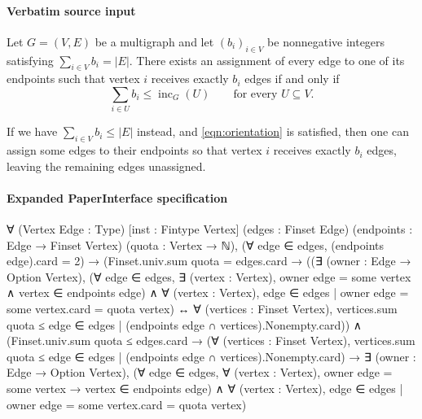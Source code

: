 \documentclass[10pt]{article}
\begin{document}
\paragraph{Verbatim source input}
\begin{ReviewVerbatim}
\begin{lemma}\label{lem:balancedorientation}
Let $G=(V,E)$ be a multigraph and let $(b_i)_{i\in V}$ be nonnegative
integers satisfying $\sum_{i\in V}b_i=|E|$.  There exists an assignment of
every edge to one of its endpoints such that vertex $i$ receives exactly
$b_i$ edges if and only if
\begin{equation}\label{eqn:orientation}
    \sum_{i\in U}b_i\le \operatorname{inc}_G(U)
 \qquad\text{for every }U\subseteq V.
\end{equation}

If we have \(\sum_{i\in V}b_i\le |E|\) instead, and \eqref{eqn:orientation} is satisfied, then one can assign some edges to their endpoints so that vertex \(i\)
receives exactly \(b_i\) edges, leaving the remaining edges unassigned.
\end{lemma}
\end{ReviewVerbatim}



\paragraph{Expanded PaperInterface specification}
\begin{ReviewVerbatim}
∀ (Vertex Edge : Type) [inst : Fintype Vertex] (edges : Finset Edge) (endpoints : Edge → Finset Vertex)
  (quota : Vertex → ℕ),
  (∀ edge ∈ edges, (endpoints edge).card = 2) →
    (Finset.univ.sum quota = edges.card →
        ((∃ (owner : Edge → Option Vertex),
            (∀ edge ∈ edges, ∃ (vertex : Vertex), owner edge = some vertex ∧ vertex ∈ endpoints edge) ∧
              ∀ (vertex : Vertex), {edge ∈ edges | owner edge = some vertex}.card = quota vertex) ↔
          ∀ (vertices : Finset Vertex),
            vertices.sum quota ≤ {edge ∈ edges | (endpoints edge ∩ vertices).Nonempty}.card)) ∧
      (Finset.univ.sum quota ≤ edges.card →
        (∀ (vertices : Finset Vertex),
            vertices.sum quota ≤ {edge ∈ edges | (endpoints edge ∩ vertices).Nonempty}.card) →
          ∃ (owner : Edge → Option Vertex),
            (∀ edge ∈ edges, ∀ (vertex : Vertex), owner edge = some vertex → vertex ∈ endpoints edge) ∧
              ∀ (vertex : Vertex), {edge ∈ edges | owner edge = some vertex}.card = quota vertex)
\end{ReviewVerbatim}
\end{document}

